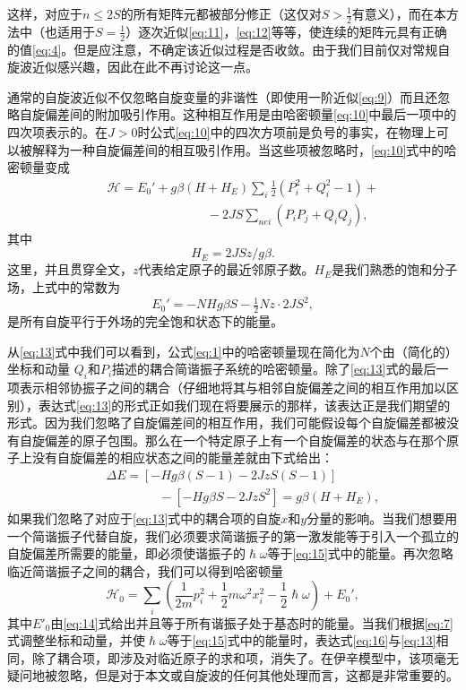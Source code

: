 \documentclass{article}
\begin{document}
这样，对应于$n\leqslant 2S$的所有矩阵元都被部分修正（这仅对$S>\frac{1}{2}$有意义），而在本方法中（也适用于$S=\frac{1}{2}$）逐次近似\eqref{eq:11}，\eqref{eq:12}等等，使连续的矩阵元具有正确的值\eqref{eq:4}。但是应注意，不确定该近似过程是否收敛。由于我们目前仅对常规自旋波近似感兴趣，因此在此不再讨论这一点。

通常的自旋波近似不仅忽略自旋变量的非谐性（即使用一阶近似\eqref{eq:9}）而且还忽略自旋偏差间的附加吸引作用。这种相互作用是由哈密顿量\eqref{eq:10}中最后一项中的四次项表示的。在$J>0$时公式\eqref{eq:10}中的四次方项前是负号的事实，在物理上可以被解释为一种自旋偏差间的相互吸引作用。当这些项被忽略时，\eqref{eq:10}式中的哈密顿量变成
\begin{eqnarray} \label{eq:13}
&&\mathcal{H}=E_0'+g\beta(H+H_E)\sum\nolimits_i\tfrac{1}{2}(P_i^2+Q_i^2-1)+\nonumber\\
&&\phantom{~~~~~~~~~~~~~~~~~~~~~~~~~~~~~~~~~~~~}-2JS\sum\nolimits_{\mathit{nei}}(P_iP_j+Q_iQ_j),
\end{eqnarray}
其中
\begin{equation*}
H_E=2JSz/g\beta.
\end{equation*}
这里，并且贯穿全文，$z$代表给定原子的最近邻原子数。$H_E$是我们熟悉的饱和分子场，上式中的常数为
\begin{equation} \label{eq:14}
E_0'=-NHg\beta S-\tfrac{1}{2}Nz\cdot 2JS^2,
\end{equation}
是所有自旋平行于外场的完全饱和状态下的能量。

从\eqref{eq:13}式中我们可以看到，公式\eqref{eq:1}中的哈密顿量现在简化为$N$个由（简化的）坐标和动量 $Q_i$和$P_i$描述的耦合简谐振子系统的哈密顿量。除了\eqref{eq:13}式的最后一项表示相邻协振子之间的耦合（仔细地将其与相邻自旋偏差之间的相互作用加以区别），表达式\eqref{eq:13}的形式正如我们现在将要展示的那样，该表达正是我们期望的形式。因为我们忽略了自旋偏差间的相互作用，我们可能假设每个自旋偏差都被没有自旋偏差的原子包围。那么在一个特定原子上有一个自旋偏差的状态与在那个原子上没有自旋偏差的相应状态之间的能量差就由下式给出：
\begin{eqnarray} \label{eq:15}
&&\Delta E=[-Hg\beta(S-1)-2JzS(S-1)]\nonumber\\
&&\phantom{~~~~~~~~~~~~~~~~~~~}-[-Hg\beta S-2JzS^2]=g\beta(H+H_E),
\end{eqnarray}
如果我们忽略了对应于\eqref{eq:13}式中的耦合项的自旋$x$和$y$分量的影响。当我们想要用一个简谐振子代替自旋，我们必须要求简谐振子的第一激发能等于引入一个孤立的自旋偏差所需要的能量，即必须使谐振子的$\hslash\omega$等于\eqref{eq:15}式中的能量。再次忽略临近简谐振子之间的耦合，我们可以得到哈密顿量
\begin{equation} \label{eq:16}
\mathcal{H}_0=\sum_i(\frac{1}{2m}p_i^2+\frac{1}{2}m\omega^2x_i^2-\frac{1}{2}\hslash\omega)+E_0',
\end{equation}
其中$E'_0$由\eqref{eq:14}式给出并且等于所有谐振子处于基态时的能量。当我们根据\eqref{eq:7}式调整坐标和动量，并使$\hslash\omega$等于\eqref{eq:15}式中的能量时，表达式\eqref{eq:16}与\eqref{eq:13}相同，除了耦合项，即涉及对临近原子的求和项，消失了。在伊辛模型中，该项毫无疑问地被忽略，但是对于本文或自旋波的任何其他处理而言，这都是非常重要的。
\end{document}
